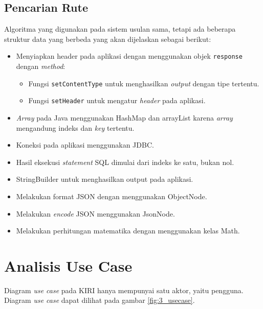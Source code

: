 \subsection{Pencarian Rute}
Algoritma yang digunakan pada sistem usulan sama, tetapi ada beberapa struktur data yang berbeda yang akan dijelaskan sebagai berikut:
\begin{itemize}
	\item Menyiapkan header pada aplikasi dengan menggunakan objek \verb!response! dengan \textit{method}:
	\begin{itemize}
		\item Fungsi \verb!setContentType! untuk menghasilkan \textit{output} dengan tipe tertentu.
		\item Fungsi \verb!setHeader! untuk mengatur \textit{header} pada aplikasi.
	\end{itemize}
	\item \textit{Array} pada Java menggunakan HashMap dan arrayList karena \textit{array} mengandung indeks dan \textit{key} tertentu.
	\item Koneksi pada aplikasi menggunakan JDBC.
	\item Hasil eksekusi \textit{statement} SQL dimulai dari indeks ke satu, bukan nol.
	\item StringBuilder untuk menghasilkan output pada aplikasi.
	\item Melakukan format JSON dengan menggunakan ObjectNode.
	\item Melakukan \textit{encode} JSON menggunakan JsonNode.
	\item Melakukan perhitungan matematika dengan menggunakan kelas Math.
\end{itemize}

\section{Analisis Use Case}
\label{sec:usecase}
Diagram \textit{use case} pada KIRI hanya mempunyai satu aktor, yaitu pengguna. Diagram \textit{use case} dapat dilihat pada gambar \ref{fig:3_usecase}.

